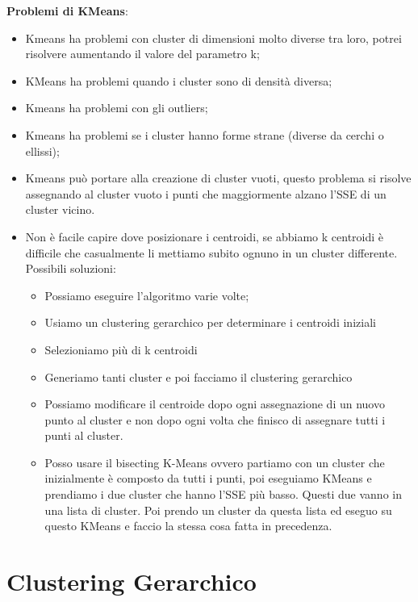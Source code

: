 \documentclass[14pt]{extreport}
\begin{document}
{\bf Problemi di KMeans}:

\begin{itemize}
    \item Kmeans ha problemi con cluster di dimensioni molto diverse tra loro, potrei risolvere aumentando il valore del parametro k;
    \item KMeans ha problemi quando i cluster sono di densità diversa;
    \item Kmeans ha problemi con gli outliers;
    \item Kmeans ha problemi se i cluster hanno forme strane (diverse da cerchi o ellissi);
    \item Kmeans può portare alla creazione di cluster vuoti, questo problema si risolve assegnando al cluster vuoto i punti che maggiormente alzano l'SSE di un cluster vicino.
    \item Non è facile capire dove posizionare i centroidi, se abbiamo k centroidi è difficile che casualmente li mettiamo subito ognuno in un cluster differente. Possibili soluzioni:
    \begin{itemize}
    \item Possiamo eseguire l'algoritmo varie volte;
    \item Usiamo un clustering gerarchico per determinare i centroidi iniziali
    \item Selezioniamo più di k centroidi
    \item Generiamo tanti cluster e poi facciamo il clustering gerarchico
    \item Possiamo modificare il centroide dopo ogni assegnazione di un nuovo punto al cluster e non dopo ogni volta che finisco di assegnare tutti i punti al cluster.
    \item Posso usare il bisecting K-Means ovvero partiamo con un cluster che inizialmente è composto da tutti i punti, poi eseguiamo KMeans e prendiamo i due cluster che hanno l'SSE più basso. Questi due vanno in una lista di cluster. Poi prendo un cluster da questa lista ed eseguo su questo KMeans e faccio la stessa cosa fatta in precedenza.
    \end{itemize}
\end{itemize}






\chapter{Clustering Gerarchico}
\end{document}
